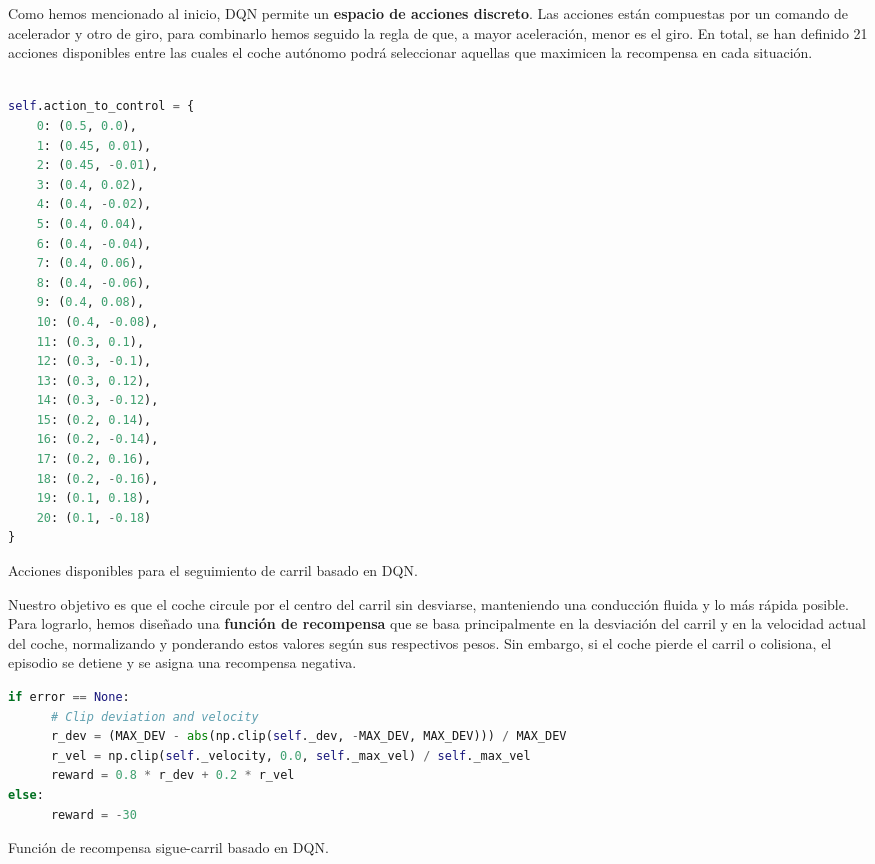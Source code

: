 \newpage

Como hemos mencionado al inicio, \ac{DQN} permite un \textbf{espacio de acciones discreto}. Las acciones están compuestas por un comando de acelerador y otro de giro, para combinarlo hemos seguido la regla de que, a mayor aceleración, menor es el giro. En total, se han definido 21 acciones disponibles entre las cuales el coche autónomo podrá seleccionar aquellas que maximicen la recompensa en cada situación.

\begin{code}[h]
\begin{lstlisting}[language=Python]

self.action_to_control = {
    0: (0.5, 0.0),
    1: (0.45, 0.01), 
    2: (0.45, -0.01),
    3: (0.4, 0.02),
    4: (0.4, -0.02),
    5: (0.4, 0.04),
    6: (0.4, -0.04),
    7: (0.4, 0.06),
    8: (0.4, -0.06),
    9: (0.4, 0.08),
    10: (0.4, -0.08),
    11: (0.3, 0.1),
    12: (0.3, -0.1),
    13: (0.3, 0.12),
    14: (0.3, -0.12),
    15: (0.2, 0.14),
    16: (0.2, -0.14),
    17: (0.2, 0.16),
    18: (0.2, -0.16),
    19: (0.1, 0.18),
    20: (0.1, -0.18)
}

\end{lstlisting}
\caption[Acciones disponibles para el seguimiento de carril basado en \ac{DQN}]{Acciones disponibles para el seguimiento de carril basado en \ac{DQN}.}
\label{cod:acc_dqn}
\end{code}

Nuestro objetivo es que el coche circule por el centro del carril sin desviarse, manteniendo una conducción fluida y lo más rápida posible. Para lograrlo, hemos diseñado una \textbf{función de recompensa} que se basa principalmente en la desviación del carril y en la velocidad actual del coche, normalizando y ponderando estos valores según sus respectivos pesos. Sin embargo, si el coche pierde el carril o colisiona, el episodio se detiene y se asigna una recompensa negativa.

\begin{code}[h]
\begin{lstlisting}[language=Python]
if error == None:
      # Clip deviation and velocity
      r_dev = (MAX_DEV - abs(np.clip(self._dev, -MAX_DEV, MAX_DEV))) / MAX_DEV
      r_vel = np.clip(self._velocity, 0.0, self._max_vel) / self._max_vel
      reward = 0.8 * r_dev + 0.2 * r_vel
else:
      reward = -30
\end{lstlisting}
\caption[Función de recompensa sigue-carril basado en \ac{DQN}]{Función de recompensa sigue-carril basado en \ac{DQN}.}
\label{cod:rew_dqn}
\end{code}

